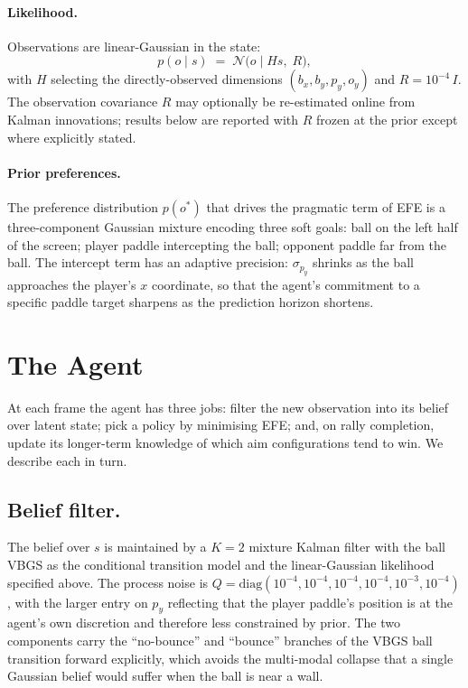 \documentclass[runningheads]{llncs}
\begin{document}
\paragraph{Likelihood.}
Observations are linear-Gaussian in the state:
\[
  p(o\mid s) \;=\; \mathcal{N}\bigl(o\mid Hs,\;R\bigr),
\]
with $H$ selecting the directly-observed dimensions
$(b_x, b_y, p_y, o_y)$ and $R = 10^{-4}\,I$. The observation
covariance $R$ may optionally be re-estimated online from Kalman
innovations; results below are reported with $R$ frozen at the
prior except where explicitly stated.

\paragraph{Prior preferences.}
The preference distribution $p(o^*)$ that drives the pragmatic
term of EFE is a three-component Gaussian mixture encoding three
soft goals: ball on the left half of the screen; player paddle
intercepting the ball; opponent paddle far from the ball. The
intercept term has an adaptive precision: $\sigma_{p_y}$ shrinks as
the ball approaches the player's $x$ coordinate, so that the
agent's commitment to a specific paddle target sharpens as the
prediction horizon shortens.

\section{The Agent}\label{sec:agent}

At each frame the agent has three jobs: filter the new observation
into its belief over latent state; pick a policy by minimising EFE;
and, on rally completion, update its longer-term knowledge of which
aim configurations tend to win. We describe each in turn.

\subsection{Belief filter.}
The belief over $s$ is maintained by a $K{=}2$ mixture Kalman filter
with the ball VBGS as the conditional transition model and the
linear-Gaussian likelihood specified above. The process noise is
$Q=\mathrm{diag}(10^{-4},10^{-4},10^{-4},10^{-4},10^{-3},10^{-4})$,
with the larger entry on $p_y$ reflecting that the player paddle's
position is at the agent's own discretion and therefore less
constrained by prior. The two components carry the ``no-bounce''
and ``bounce'' branches of the VBGS ball transition forward
explicitly, which avoids the multi-modal collapse that a single
Gaussian belief would suffer when the ball is near a wall.
\end{document}
